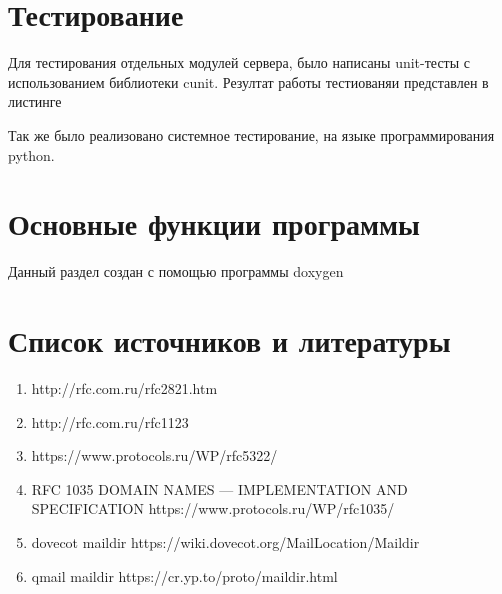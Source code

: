 \documentclass[a4paper,12pt]{report}
\begin{document}
	\section{Тестирование}
		Для тестирования отдельных модулей сервера, было написаны unit-тесты
		с использованием библиотеки cunit. Резултат работы тестиованяи представлен
		в листинге 
		
		Так же было реализовано системное тестирование, на языке программирования python.

\section{Основные функции программы}

Данный раздел  создан с помощью программы doxygen



   



	

	\section{Список источников и литературы}
	\begin{enumerate}
		\item http://rfc.com.ru/rfc2821.htm
		\item http://rfc.com.ru/rfc1123
		\item https://www.protocols.ru/WP/rfc5322/
		\item RFC 1035 DOMAIN NAMES — IMPLEMENTATION AND SPECIFICATION  https://www.protocols.ru/WP/rfc1035/
		\item dovecot maildir https://wiki.dovecot.org/MailLocation/Maildir
		\item qmail maildir https://cr.yp.to/proto/maildir.html
	\end{enumerate}
	
	\newpage
\end{document}
